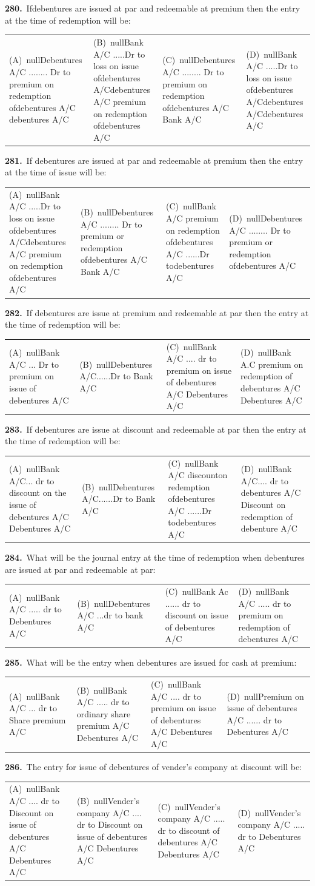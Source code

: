 \documentclass[11pt,a4paper]{article}
\makeatletter
\newcommand{\mcq}[6]{%
  \Needspace{4\baselineskip}%
  \par\medskip\noindent\textbf{#1.}\ #2\par\nopagebreak
  \noindent\begin{tabularx}{\linewidth}{@{\hspace{1.5em}}*{4}{>{\raggedright\arraybackslash}X}@{}}
    (A)~#3 & (B)~#4 & (C)~#5 & (D)~#6
  \end{tabularx}\par}
\makeatother
\begin{document}
\mcq{280}{Ifdebentures are issued at par and redeemable at premium then the entry at the time of redemption will be:}{nullDebentures A/C ........ Dr to premium on redemption ofdebentures A/C debentures A/C}{nullBank A/C .....Dr to loss on issue ofdebentures A/Cdebentures A/C premium on redemption ofdebentures A/C}{nullDebentures A/C ........ Dr to premium on redemption ofdebentures A/C Bank A/C}{nullBank A/C .....Dr to loss on issue ofdebentures A/Cdebentures A/Cdebentures A/C}
\mcq{281}{If debentures are issued at par and redeemable at premium then the entry at the time of issue will be:}{nullBank A/C .....Dr to loss on issue ofdebentures A/Cdebentures A/C premium on redemption ofdebentures A/C}{nullDebentures A/C ........ Dr to premium or redemption ofdebentures A/C Bank A/C}{nullBank A/C premium on redemption ofdebentures A/C ......Dr todebentures A/C}{nullDebentures A/C ........ Dr to premium or redemption ofdebentures A/C}
\mcq{282}{If debentures are issue at premium and redeemable at par then the entry at the time of redemption will be:}{nullBank A/C ... Dr to premium on issue of debentures A/C}{nullDebentures A/C......Dr to Bank A/C}{nullBank A/C .... dr to premium on issue of debentures A/C Debentures A/C}{nullBank A.C premium on redemption of debentures A/C Debentures A/C}
\mcq{283}{If debentures are issue at discount and redeemable at par then the entry at the time of redemption will be:}{nullBank A/C... dr to discount on the issue of debentures A/C Debentures A/C}{nullDebentures A/C......Dr to Bank A/C}{nullBank A/C discounton redemption ofdebentures A/C ......Dr todebentures A/C}{nullBank A/C.... dr to debentures A/C Discount on redemption of debenture A/C}
\mcq{284}{What will be the journal entry at the time of redemption when debentures are issued at par and redeemable at par:}{nullBank A/C ..... dr to Debentures A/C}{nullDebentures A/C ...dr to bank A/C}{nullBank Ac ...... dr to discount on issue of debentures A/C}{nullBank A/C ..... dr to premium on redemption of debentures A/C}
\mcq{285}{What will be the entry when debentures are issued for cash at premium:}{nullBank A/C ... dr to Share premium A/C}{nullBank A/C ..... dr to ordinary share premium A/C Debentures A/C}{nullBank A/C .... dr to premium on issue of debentures A/C Debentures A/C}{nullPremium on issue of debentures A/C ...... dr to Debentures A/C}
\mcq{286}{The entry for issue of debentures of vender's company at discount will be:}{nullBank A/C .... dr to Discount on issue of debentures A/C Debentures A/C}{nullVender's company A/C .... dr to Discount on issue of debentures A/C Debentures A/C}{nullVender's company A/C ..... dr to discount of debentures A/C Debentures A/C}{nullVender's company A/C ..... dr to Debentures A/C}
\end{document}
